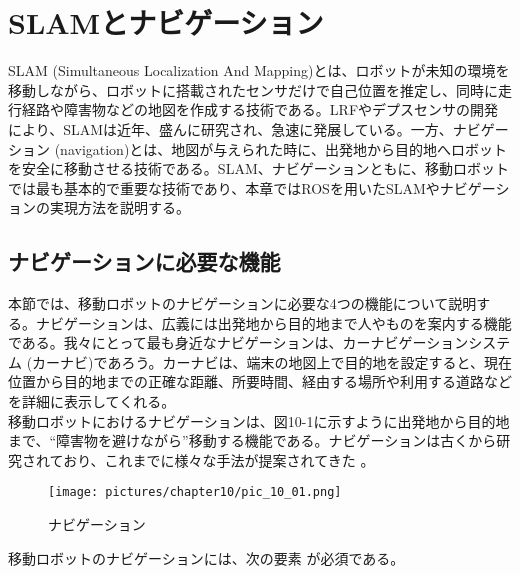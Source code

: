 
\chapter{SLAMとナビゲーション}
\label{section:slam}

SLAM (Simultaneous Localization And Mapping)とは、ロボットが未知の環境を移動しながら、ロボットに搭載されたセンサだけで自己位置を推定し、同時に走行経路や障害物などの地図を作成する技術である。LRFやデプスセンサの開発により、SLAMは近年、盛んに研究され、急速に発展している。一方、ナビゲーション (navigation)とは、地図が与えられた時に、出発地から目的地へロボットを安全に移動させる技術である。SLAM、ナビゲーションともに、移動ロボットでは最も基本的で重要な技術であり、本章ではROSを用いたSLAMやナビゲーションの実現方法を説明する。

\section{ナビゲーションに必要な機能}

本節では、移動ロボットのナビゲーションに必要な4つの機能について説明する。ナビゲーションは、広義には出発地から目的地まで人やものを案内する機能である。我々にとって最も身近なナビゲーションは、カーナビゲーションシステム (カーナビ)であろう。カーナビは、端末の地図上で目的地を設定すると、現在位置から目的地までの正確な距離、所要時間、経由する場所や利用する道路などを詳細に表示してくれる。\\

移動ロボットにおけるナビゲーションは、図10-1に示すように出発地から目的地まで、``障害物を避けながら''移動する機能である。ナビゲーションは古くから研究されており、これまでに様々な手法が提案されてきた  。\\

\begin{figure}[htp]
  \centering
  \texttt{[image: pictures/chapter10/pic\_10\_01.png]}
  \caption{ナビゲーション}
\end{figure}

移動ロボットのナビゲーションには、次の要素  が必須である。\\


